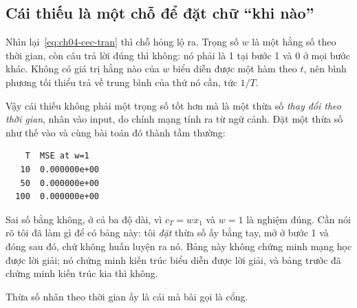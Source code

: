 \subsection*{Cái thiếu là một chỗ để đặt chữ \enquote{khi nào}}

Nhìn lại~\eqref{eq:ch04-cec-tran} thì chỗ hỏng lộ ra. Trọng số \(w\) là một
hằng số theo thời gian, còn câu trả lời đúng thì không: nó phải là 1 tại bước
1 và 0 ở mọi bước khác. Không có giá trị hằng nào của \(w\) biểu diễn được một
hàm theo \(t\), nên bình phương tối thiểu trả về trung bình của thứ nó cần, tức
\(1/T\).

Vậy cái thiếu không phải một trọng số tốt hơn mà là một thừa số \emph{thay đổi
theo thời gian}, nhân vào input, do chính mạng tính ra từ ngữ cảnh. Đặt một
thừa số như thế vào và cùng bài toán đó thành tầm thường:

\begin{verbatim}
    T  MSE at w=1
   10  0.000000e+00
   50  0.000000e+00
  100  0.000000e+00
\end{verbatim}

Sai số bằng không, ở cả ba độ dài, vì \(c_T = w x_1\) và \(w = 1\) là nghiệm
đúng. Cần nói rõ tôi đã làm gì để có bảng này: tôi \emph{đặt} thừa số ấy bằng
tay, mở ở bước 1 và đóng sau đó, chứ không huấn luyện ra nó. Bảng này không
chứng minh mạng học được lời giải; nó chứng minh kiến trúc biểu diễn được lời
giải, và bảng trước đã chứng minh kiến trúc kia thì không.

Thừa số nhân theo thời gian ấy là cái mà bài gọi là cổng.
